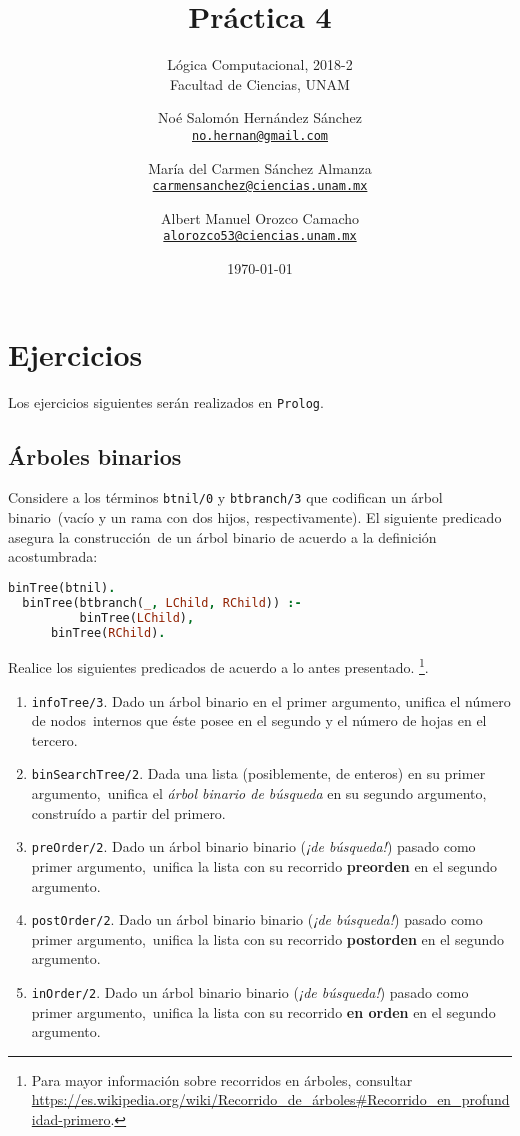 \documentclass[paper=letter, fontsize=12pt]{scrartcl}
\title{Práctica 4}
\subtitle{
  Lógica Computacional, 2018-2\\
  Facultad de Ciencias, UNAM
}
\author{
  \normalsize
  Noé Salomón Hernández Sánchez\\
  \normalsize
  \texttt{\href{mailto:no.hernan@gmail.com}{no.hernan@gmail.com}}
  \and
  \normalsize
  María del Carmen Sánchez Almanza\\
  \normalsize
  \texttt{\href{mailto:carmensanchez@ciencias.unam.mx}{carmensanchez@ciencias.unam.mx}}
  \and
  \normalsize
  Albert Manuel Orozco Camacho\\
  \normalsize
  \texttt{\href{mailto:alorozco53@ciencias.unam.mx}{alorozco53@ciencias.unam.mx}}
}
\date{\today}
\begin{document}
\maketitle

\section{Ejercicios}

Los ejercicios siguientes serán realizados en \verb+Prolog+.

\subsection{Árboles binarios}

Considere a los términos \verb+btnil/0+ y \verb+btbranch/3+ que codifican un árbol binario\
(vacío y un rama con dos hijos, respectivamente). El siguiente predicado asegura la construcción\
de un árbol binario de acuerdo a la definición acostumbrada:

\begin{lstlisting}[language=Prolog]
  binTree(btnil).
  binTree(btbranch(_, LChild, RChild)) :-
          binTree(LChild),
	  binTree(RChild).
\end{lstlisting}

\noindent
Realice los siguientes predicados de acuerdo a lo antes presentado.%
\footnote{
  Para mayor información sobre recorridos en árboles, consultar \url{https://es.wikipedia.org/wiki/Recorrido_de_árboles\#Recorrido_en_profundidad-primero}.
}.

\begin{enumerate}
\item \verb+infoTree/3+. Dado un árbol binario en el primer argumento, unifica el número de nodos\
  internos que éste posee en el segundo y el número de hojas en el tercero.
\item \verb+binSearchTree/2+. Dada una lista (posiblemente, de enteros) en su primer argumento,\
  unifica el \emph{árbol binario de búsqueda} en su segundo argumento, construído a partir del primero.
\item \verb+preOrder/2+. Dado un árbol binario binario (\emph{¡de búsqueda!}) pasado como primer argumento,\
  unifica la lista con su recorrido \textbf{preorden} en el segundo argumento.
\item \verb+postOrder/2+. Dado un árbol binario binario (\emph{¡de búsqueda!}) pasado como primer argumento,\
  unifica la lista con su recorrido \textbf{postorden} en el segundo argumento.
\item \verb+inOrder/2+. Dado un árbol binario binario (\emph{¡de búsqueda!}) pasado como primer argumento,\
  unifica la lista con su recorrido \textbf{en orden} en el segundo argumento.
\end{enumerate}
\end{document}
